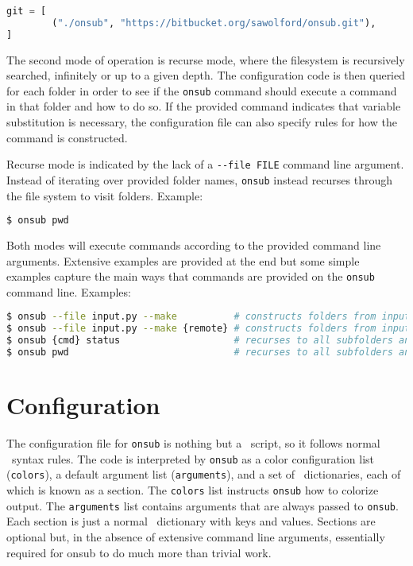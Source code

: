 \begin{snugshade}
\begin{lstlisting}[language=python]
git = [
		("./onsub", "https://bitbucket.org/sawolford/onsub.git"),
]
\end{lstlisting}
\end{snugshade}

The second mode of operation is recurse mode, where the filesystem is recursively searched, infinitely or up to a given depth. The configuration code is then queried for each folder in order to see if the \lstinline{onsub} command should execute a command in that folder and how to do so. If the provided command indicates that variable substitution is necessary, the configuration file can also specify rules for how the command is constructed.

Recurse mode is indicated by the lack of a \lstinline{--file FILE} command line argument. Instead of iterating over provided folder names, \lstinline{onsub} instead recurses through the file system to visit folders. Example:

\begin{snugshade}
\begin{lstlisting}[language=bash]
$ onsub pwd
\end{lstlisting}
\end{snugshade}

Both modes will execute commands according to the provided command line arguments. Extensive examples are provided at the end but some simple examples capture the main ways that commands are provided on the \lstinline{onsub} command line. Examples:

\begin{snugshade}
\begin{lstlisting}[language=bash]
$ onsub --file input.py --make          # constructs folders from input.py in parallel
$ onsub --file input.py --make {remote} # constructs folders from input.py in parallel, then executes "{remote}" command in each
$ onsub {cmd} status                    # recurses to all subfolders and runs "{cmd} status"
$ onsub pwd                             # recurses to all subfolders and runs "pwd"
\end{lstlisting}
\end{snugshade}

\section{Configuration}
The configuration file for \lstinline{onsub} is nothing but a \Python\ script, so it follows normal \Python\ syntax rules. The code is interpreted by \lstinline{onsub} as a color configuration list (\lstinline{colors}), a default argument list (\lstinline{arguments}), and a set of \Python\ dictionaries, each of which is known as a section. The \lstinline{colors} list instructs \lstinline{onsub} how to colorize output. The \lstinline{arguments} list contains arguments that are always passed to \lstinline{onsub}. Each section is just a normal \Python\ dictionary with keys and values. Sections are optional but, in the absence of extensive command line arguments, essentially required for onsub to do much more than trivial work.

